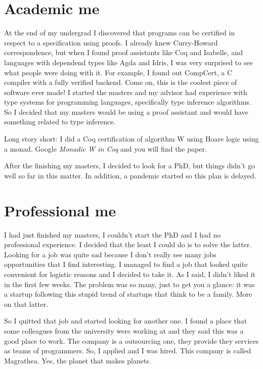 \documentclass[11pt,a4paper,sans]{moderncv}
\begin{document}
\medskip

\section{Academic me}
At the end of my undergrad I discovered that programs can be certified in respect to a specification using proofs.
I already knew Curry-Howard correspondence, but when I found proof assistants like Coq and Isabelle, and languages with dependend types like Agda and Idris, I was very surprised to see what people were doing with it.
For example, I found out CompCert, a C compiler with a fully verified backend.
Come on, this is the coolest piece of software ever made!
I started the masters and my advisor had experience with type systems for programming languages, specifically type inference algorithms.
So I decided that my masters would be using a proof assistant and would have something related to type inference.

\medskip

Long story short: I did a Coq certification of algorithm W using Hoare logic using a monad.
Google \textit{Monadic W in Coq} and you will find the paper.

\medskip

After the finishing my masters, I decided to look for a PhD, but things didn't go well so far in this matter.
In addition, a pandemic started so this plan is delayed.

\section{Professional me}
I had just finished my masters, I couldn't start the PhD and I had no professional experience.
I decided that the least I could do is to solve the latter.
Looking for a job was quite sad because I don't really see many jobs opportunities that I find interesting.
I managed to find a job that looked quite convenient for logistic reasons and I decided to take it.
As I said, I didn't liked it in the first few weeks.
The problem was so many, just to get you a glance: it was a startup following this stupid trend of startups that think to be a family.
More on that latter.

\medskip

So I quitted that job and started looking for another one.
I found a place that some colleagues from the university were working at and they said this was a good place to work.
The company is a outsourcing one, they provide they services as teams of programmers.
So, I applied and I was hired.
This company is called Magrathea.
Yes, the planet that makes planets.
\end{document}
